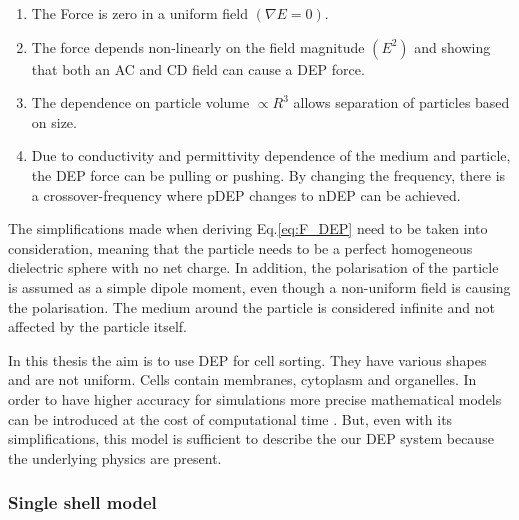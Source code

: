\documentclass[final]{jyflluk}
\begin{document}
\begin{enumerate}
\renewcommand{\labelenumi}{\Roman{enumi}}  %
    \setlength{\itemsep}{1pt}
    \setlength{\parskip}{1pt}
    \item The Force is zero in a uniform field $(\nabla E=0)$.
    \item The force depends non-linearly on the field magnitude $(E^2)$ and showing that both an AC and CD field can cause a DEP force.
    \item The dependence on particle volume $\propto R^3$ allows separation of particles based on size.
    \item Due to conductivity and permittivity dependence of the medium and particle, the DEP force can be pulling or  pushing. By changing the frequency, there is a crossover-frequency where pDEP changes to nDEP can be achieved. \cite{zhang_dielectrophoresis_2010}
\end{enumerate}
The simplifications made when deriving Eq.\ref{eq:F_DEP} need to be taken into consideration, meaning that the particle needs to be a perfect homogeneous dielectric sphere with no net charge. In addition, the polarisation of the particle is assumed as a simple dipole moment, even though a non-uniform field is causing the polarisation.  The medium around the particle is considered infinite and not affected by the particle itself. \cite{pethig_review_2010}

In this thesis the aim is to use DEP for cell sorting. They have various shapes and are not uniform. Cells contain membranes, cytoplasm and organelles. In order to have higher accuracy for simulations more precise mathematical models can be introduced at the cost of computational time \cite{jubery_dielectrophoretic_2014, cetin_dielectrophoresis_2011, pethig_review_2010, cottet_mydep_2019}. But, even with its simplifications, this model is sufficient to describe the our DEP system because the underlying physics are present.

\subsubsection{Single shell model}
\label{sec:x3.2}
\end{document}
